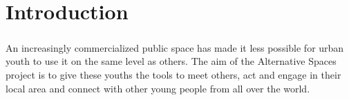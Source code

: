 \chapter{Introduction}

\paragraph{} An increasingly commercialized public space has made it less possible for urban youth to use it on the same level as others. The aim of the Alternative Spaces project is to give these youths the tools to meet others, act and engage in their local area and connect with other young people from all over the world.